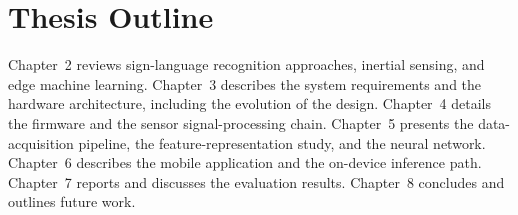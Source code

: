 \section{Thesis Outline}

Chapter~2 reviews sign-language recognition approaches, inertial sensing, and
edge machine learning. Chapter~3 describes the system requirements and the
hardware architecture, including the evolution of the design. Chapter~4 details
the firmware and the sensor signal-processing chain. Chapter~5 presents the
data-acquisition pipeline, the feature-representation study, and the neural
network. Chapter~6 describes the mobile application and the on-device inference
path. Chapter~7 reports and discusses the evaluation results. Chapter~8
concludes and outlines future work.
